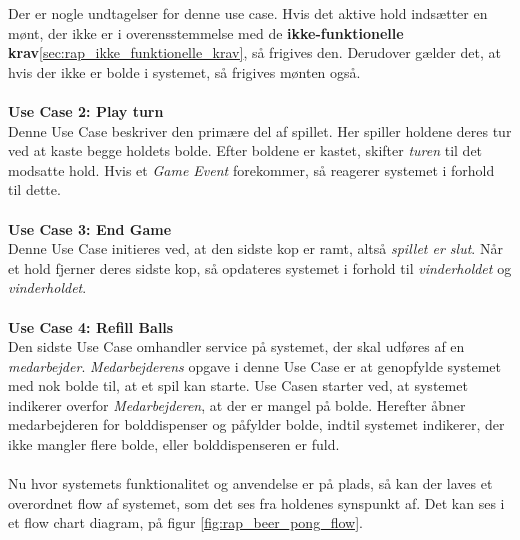 \documentclass[Rapport/Rapport_main.tex]{subfiles}
\begin{document}
Der er nogle undtagelser for denne use case. Hvis det aktive hold indsætter en mønt, der ikke er i overensstemmelse med de \textbf{ikke-funktionelle krav}\ref{sec:rap_ikke_funktionelle_krav}, så frigives den. Derudover gælder det, at hvis der ikke er bolde i systemet, så frigives mønten også.\\\\
\textbf{Use Case 2: Play turn}\\
Denne Use Case beskriver den primære del af spillet. Her spiller holdene  deres tur ved at kaste begge holdets bolde.  Efter boldene er kastet, skifter \textit{turen} til det modsatte hold. Hvis et \textit{Game Event} forekommer, så reagerer systemet i forhold til dette.\\\\
\textbf{Use Case 3: End Game}\\
Denne Use Case initieres ved, at den sidste kop er ramt, altså \textit{spillet er slut}. Når et hold fjerner deres sidste kop, så opdateres systemet i forhold til \textit{vinderholdet} og \textit{vinderholdet}.\\\\
\textbf{Use Case 4: Refill Balls}\\
Den sidste Use Case omhandler service på systemet, der skal udføres af en \textit{medarbejder}. \textit{Medarbejderens} opgave i denne Use Case er at genopfylde systemet med nok bolde til, at et spil kan starte. Use Casen starter ved, at systemet indikerer overfor \textit{Medarbejderen}, at der er mangel på bolde. Herefter åbner medarbejderen for bolddispenser og påfylder bolde, indtil systemet indikerer, der ikke mangler flere bolde, eller bolddispenseren er fuld.\\\\
Nu hvor systemets funktionalitet og anvendelse er på plads, så kan der laves et overordnet flow af systemet, som det ses fra holdenes synspunkt af. Det kan ses i et flow chart diagram, på figur \ref{fig:rap_beer_pong_flow}.
\end{document}
